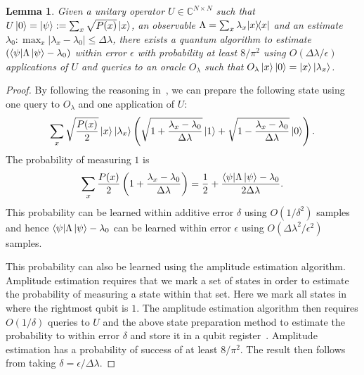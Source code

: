 \documentclass[aps,amsmath,onecolumn,amssymb,notitlepage]{revtex4-1}
\newtheorem{lemma}{Lemma}
\begin{document}
\begin{lemma}
Given a unitary operator $U\in \mathbb{C}^{N\times N}$ such that $U\left|0\right\rangle=\left|\psi\right\rangle:=\sum_x \sqrt{P(x)} \left|x\right\rangle$, an observable $\Lambda=\sum_x \lambda_x |x\rangle\!\langle x|$ and an estimate $\lambda_0:\max_x|\lambda_x-\lambda_0|\le \Delta\lambda$, there exists a quantum algorithm to estimate $(\langle\psi| \Lambda\left|\psi\right\rangle -\lambda_0)$ within error $\epsilon$ with probability at least $8/\pi^2$ using $ O(\Delta\lambda/\epsilon)$ applications of $U$ and queries to an oracle $O_\lambda$ such that $O_\lambda\left|x\right\rangle\left|0\right\rangle= \left|x\right\rangle\left|\lambda_x\right\rangle$.\label{lem:ampest}
\end{lemma}
\begin{proof}
By following the reasoning in~, we can prepare the following state using one query to $O_\lambda$ and one application of $U$:
\begin{equation}
\sum_{x} \sqrt{\frac{P(x)}{2}} \left|x\right\rangle\left|\lambda_x\right\rangle\left(\sqrt{1+\frac{\lambda_x-\lambda_0 }{\Delta \lambda}}\left|1\right\rangle + \sqrt{1-\frac{\lambda_x-\lambda_0 }{\Delta \lambda}}\left|0\right\rangle \right).\label{eq:hadtest}
\end{equation}
The probability of measuring $1$ is 
\begin{equation}
\sum_x \frac{P(x)}{2} \left(1+ \frac{\lambda_x - \lambda_0}{\Delta \lambda} \right)=\frac{1}{2} + \frac{\langle\psi| \Lambda \left|\psi\right\rangle-\lambda_0}{2\Delta \lambda}.\label{eq:mark}
\end{equation}
This probability can be learned within additive error $\delta$ using $O(1/\delta^2)$ samples and hence $\langle\psi| \Lambda \left|\psi\right\rangle-\lambda_0$ can be learned within error $\epsilon$ using $O(\Delta \lambda^2 /\epsilon^2)$ samples.

This probability can also be learned using the amplitude estimation algorithm.  Amplitude estimation requires that we mark a set of states in order to estimate the probability of measuring a state within that set.  Here we mark all states in~ where the rightmost qubit is $1$. The amplitude estimation algorithm then requires $O(1/\delta)$ queries to $U$ and the above state preparation method to estimate the probability to within error $\delta$ and store it in a qubit register~\cite{BHM+02}.  Amplitude estimation has a probability of success of at least $8/\pi^2$.  The result then follows from taking $\delta=\epsilon/\Delta \lambda$.
\end{proof}
%
\end{document}
